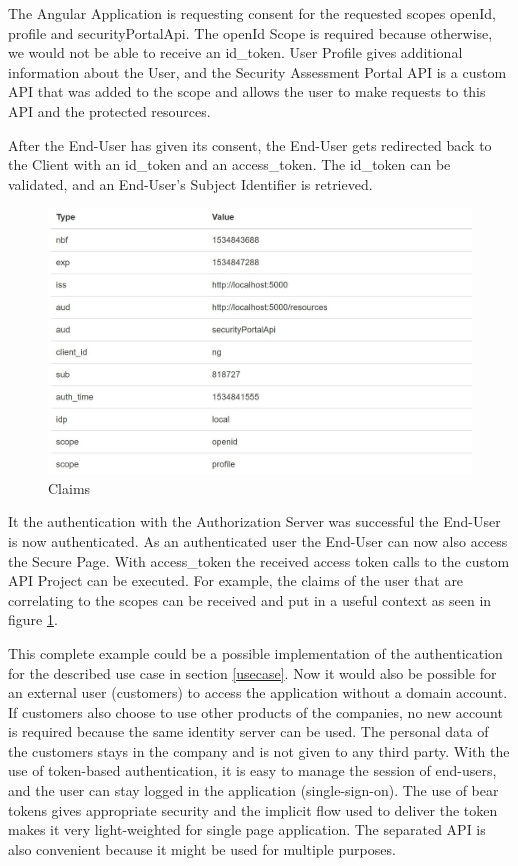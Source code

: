 The Angular Application is requesting consent for the requested scopes openId, profile and securityPortalApi. The openId Scope is required because otherwise, we would not be able to receive an id\_token. User Profile gives additional information about the User, and the  Security Assessment Portal API is a custom API that was added to the scope and allows the user to make requests to this API and the protected resources. 


After the End-User has given its consent, the End-User gets redirected back to the Client with an id\_token and an access\_token. The id\_token can be validated, and an End-User’s Subject Identifier is retrieved.


\begin{figure}[h]
	\centering
	\includegraphics[width=0.7\linewidth]{images/claims}
	\caption{Claims}
	\label{fig:claims}
\end{figure}


It the authentication with the Authorization Server was successful the End-User is now authenticated. As an authenticated user the End-User can now also access the Secure Page. With access\_token the received access token calls to the custom API Project can be executed. For example, the claims of the user that are correlating to the scopes can be received and put in a useful context as seen in figure \ref{fig:claims}.

This complete example could be a possible implementation of the authentication for the described use case in section \ref{usecase}. Now it would also be possible for an external user (customers) to access the application without a domain account. If customers also choose to use other products of the companies, no new account is required because the same identity server can be used. The personal data of the customers stays in the company and is not given to any third party. With the use of token-based authentication, it is easy to manage the session of end-users, and the user can stay logged in the application (single-sign-on). The use of bear tokens gives appropriate security and the implicit flow used to deliver the token makes it very light-weighted for single page application. The separated API is also convenient because it might be used for multiple purposes.

\chapterend
